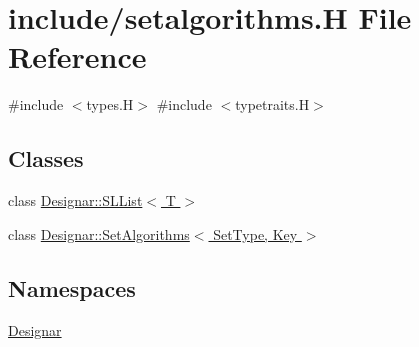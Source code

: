\hypertarget{setalgorithms_8_h}{}\section{include/setalgorithms.H File Reference}
\label{setalgorithms_8_h}
{\ttfamily \#include $<$types.\+H$>$}\newline
{\ttfamily \#include $<$typetraits.\+H$>$}\newline
\subsection*{Classes}
\begin{DoxyCompactItemize}
\item 
class \hyperlink{class_designar_1_1_s_l_list}{Designar\+::\+S\+L\+List$<$ T $>$}
\item 
class \hyperlink{class_designar_1_1_set_algorithms}{Designar\+::\+Set\+Algorithms$<$ Set\+Type, Key $>$}
\end{DoxyCompactItemize}
\subsection*{Namespaces}
\begin{DoxyCompactItemize}
\item 
 \hyperlink{namespace_designar}{Designar}
\end{DoxyCompactItemize}
